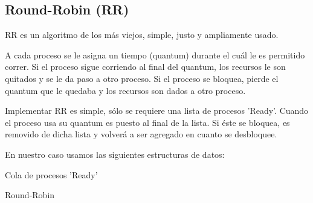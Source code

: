 \subsection{Round-Robin (RR)}
RR es un algoritmo de los más viejos, simple, justo y ampliamente usado.\newline

A cada proceso se le asigna un tiempo (quantum) durante el cuál le es permitido correr.
Si el proceso sigue corriendo al final del quantum, los recursos le son quitados y se le da paso a otro proceso.
Si el proceso se bloquea, pierde el quantum que le quedaba y los recursos son dados a otro proceso.\newline

Implementar RR es simple, sólo se requiere una lista de procesos 'Ready'.\newline
Cuando el proceso usa su quantum es puesto al final de la lista. \newline
Si éste se bloquea, es removido de dicha lista y volverá a ser agregado en cuanto se desbloquee.

En nuestro caso usamos las siguientes estructuras de datos:
 \begin{description}
  \item[Cola de procesos 'Ready']{}
 \end{description}

\begin{algorithm}
 \caption{Round-Robin}
 \begin{algorithmic}[1] 
 \EndProcedure
\newline

 \EndProcedure
\newline

   \Else
	 \EndIf	    
      \EndIf
   \EndIf
 \EndProcedure
\newline
 
    \EndIf
 \EndProcedure
 \end{algorithmic}
\end{algorithm}

